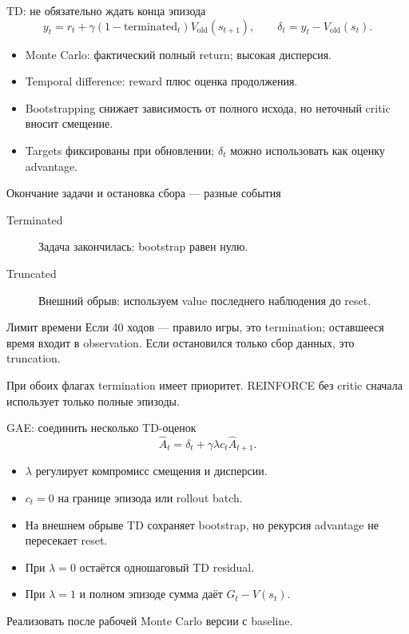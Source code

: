 \documentclass[aspectratio=169]{beamer}
\begin{document}
\begin{frame}{TD: не обязательно ждать конца эпизода}
  \[
    y_t=r_t+\gamma(1-\mathrm{terminated}_t)V_{\mathrm{old}}(s_{t+1}),
    \qquad\delta_t=y_t-V_{\mathrm{old}}(s_t).
  \]
  \begin{itemize}
    \item Monte Carlo: фактический полный return; высокая дисперсия.
    \item Temporal difference: reward плюс оценка продолжения.
    \item Bootstrapping снижает зависимость от полного исхода,
      но неточный critic вносит смещение.
    \item Targets фиксированы при обновлении; $\delta_t$ можно
      использовать как оценку advantage.
  \end{itemize}
\end{frame}

\begin{frame}{Окончание задачи и остановка сбора --- разные события}
  \begin{description}
    \item[Terminated] Задача закончилась: bootstrap равен нулю.
    \item[Truncated] Внешний обрыв: используем value последнего
      наблюдения до reset.
  \end{description}
  \begin{block}{Лимит времени}
    Если 40 ходов --- правило игры, это termination;
    оставшееся время входит в observation.
    Если остановился только сбор данных, это truncation.
  \end{block}
  При обоих флагах termination имеет приоритет.
  REINFORCE без critic сначала использует только полные эпизоды.
\end{frame}

\begin{frame}{GAE: соединить несколько TD-оценок}
  \[
    \widehat A_t=\delta_t+\gamma\lambda c_t\widehat A_{t+1}.
  \]
  \begin{itemize}
    \item $\lambda$ регулирует компромисс смещения и дисперсии.
    \item $c_t=0$ на границе эпизода или rollout batch.
    \item На внешнем обрыве TD сохраняет bootstrap, но рекурсия
      advantage не пересекает reset.
    \item При $\lambda=0$ остаётся одношаговый TD residual.
    \item При $\lambda=1$ и полном эпизоде сумма даёт $G_t-V(s_t)$.
  \end{itemize}
  Реализовать после рабочей Monte Carlo версии с baseline.
\end{frame}
\end{document}
